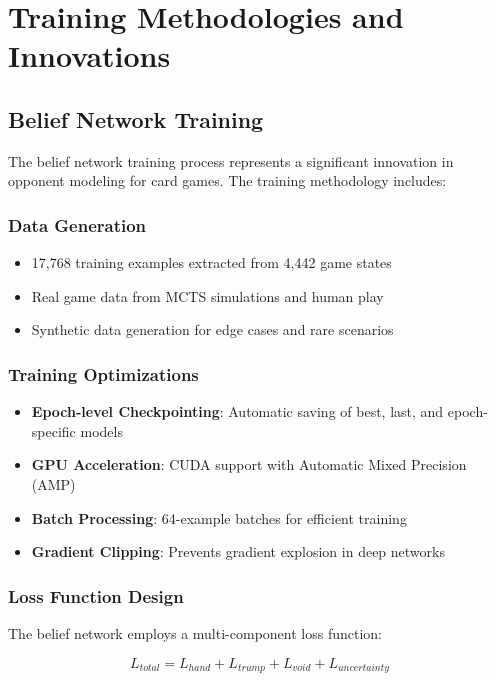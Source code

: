 \documentclass[conference]{IEEEtran}
\begin{document}
\section{Training Methodologies and Innovations}

\subsection{Belief Network Training}

The belief network training process represents a significant innovation in opponent modeling for card games. The training methodology includes:

\subsubsection{Data Generation}
\begin{itemize}
    \item 17,768 training examples extracted from 4,442 game states
    \item Real game data from MCTS simulations and human play
    \item Synthetic data generation for edge cases and rare scenarios
\end{itemize}

\subsubsection{Training Optimizations}
\begin{itemize}
    \item \textbf{Epoch-level Checkpointing}: Automatic saving of best, last, and epoch-specific models
    \item \textbf{GPU Acceleration}: CUDA support with Automatic Mixed Precision (AMP)
    \item \textbf{Batch Processing}: 64-example batches for efficient training
    \item \textbf{Gradient Clipping}: Prevents gradient explosion in deep networks
\end{itemize}

\subsubsection{Loss Function Design}
The belief network employs a multi-component loss function:

\begin{equation}
L_{total} = L_{hand} + L_{trump} + L_{void} + L_{uncertainty}
\end{equation}
\end{document}
